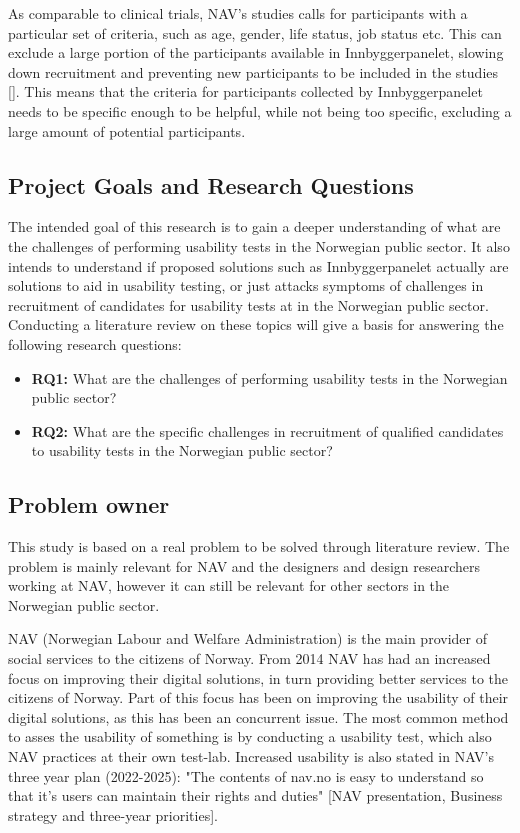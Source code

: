 As comparable to clinical trials, NAV's studies calls for participants with a particular set of criteria, such as age, gender, life status, job status etc. This can exclude a large portion of the participants available in Innbyggerpanelet, slowing down recruitment and preventing new participants to be included in the studies [\cite{nc_2020}]. This means that the criteria for participants collected by Innbyggerpanelet needs to be specific enough to be helpful, while not being too specific, excluding a large amount of potential participants.

\subsection{Project Goals and Research Questions}
The intended goal of this research is to gain a deeper understanding of what are the challenges of performing usability tests in the Norwegian public sector. It also intends to understand if proposed solutions such as Innbyggerpanelet actually are solutions to aid in usability testing, or just attacks symptoms of challenges in recruitment of candidates for usability tests at in the Norwegian public sector. Conducting a literature review on these topics will give a basis for answering the following research questions: 

\begin{itemize}
    \item \textbf{RQ1:} What are the challenges of performing usability tests in the Norwegian public sector?
    \item \textbf{RQ2:} What are the specific challenges in recruitment of qualified candidates to usability tests in the Norwegian public sector?
\end{itemize}


\subsection{Problem owner}
This study is based on a real problem to be solved through literature review. The problem is mainly relevant for NAV and the designers and design researchers working at NAV, however it can still be relevant for other sectors in the Norwegian public sector.

NAV (Norwegian Labour and Welfare Administration) is the main provider of social services to the citizens of Norway. From 2014 NAV has had an increased focus on improving their digital solutions, in turn providing better services to the citizens of Norway. Part of this focus has been on improving the usability of their digital solutions, as this has been an concurrent issue. The most common method to asses the usability of something is by conducting a usability test, which also NAV practices at their own test-lab. Increased usability is also stated in NAV's three year plan (2022-2025): "The contents of nav.no is easy to understand so that it's users can maintain their rights and duties" [NAV presentation, Business strategy and three-year priorities].


